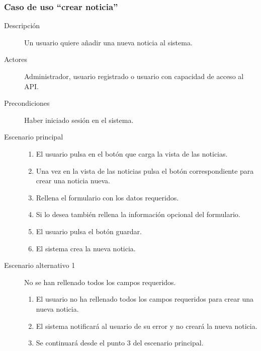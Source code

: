 \subsubsection{Caso de uso ``crear noticia''}
\begin{description}
\item[Descripción]  Un usuario quiere añadir una nueva noticia al sistema.
\item[Actores]  Administrador, usuario registrado o usuario con capacidad de acceso al API.
\item[Precondiciones] Haber iniciado sesión en el sistema.
\item[Escenario principal]  \hfill
							\begin{enumerate}
							\item El usuario pulsa en el botón que carga la vista de las noticias.
							\item Una vez en la vista de las noticias pulsa el botón correspondiente para crear una noticia nueva.
							\item Rellena el formulario con los datos requeridos.
							\item Si lo desea también rellena la información opcional del formulario.
							\item El usuario pulsa el botón guardar.
							\item El sistema crea la nueva noticia.
							\end{enumerate}
\item[Escenario alternativo 1] No se han rellenado todos los campos requeridos.
							\begin{enumerate}
							\item El usuario no ha rellenado todos los campos requeridos para crear una nueva noticia.
							\item El sistema notificará al usuario de su error y no creará la nueva noticia.
							\item Se continuará desde el punto 3 del escenario principal.
							\end{enumerate}
\end{description}


